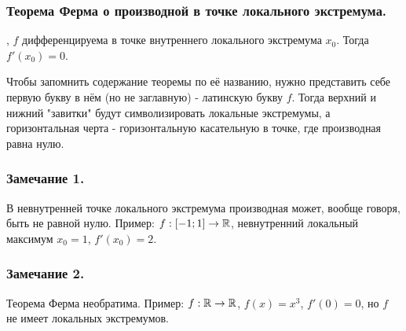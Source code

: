 \subsubsection{Теорема Ферма о производной в точке локального экстремума.}

\fXR, $f$ дифференцируема в точке внутреннего локального экстремума $x_0$.
Тогда $f'(x_0)=0$.

\mnemo
Чтобы запомнить содержание теоремы по её названию, нужно представить себе первую букву в нём (но не заглавную) - латинскую букву $f$. Тогда верхний и нижний "завитки" будут символизировать локальные экстремумы, а горизонтальная черта - горизонтальную касательную в точке, где производная равна нулю.  

\subsubsection{Замечание 1.}

В невнутренней точке локального экстремума производная может, вообще говоря, быть не равной нулю.
Пример: $f:[-1;1]\to \mathbb{R}$, невнутренний локальный максимум $x_0 = 1$, $f'(x_0)=2$.

\subsubsection{Замечание 2.}
Теорема Ферма необратима.
Пример: $f:\mathbb{R}\to\mathbb{R}$, $f(x)=x^3$, $f'(0)=0$, но $f$ не имеет локальных экстремумов.



